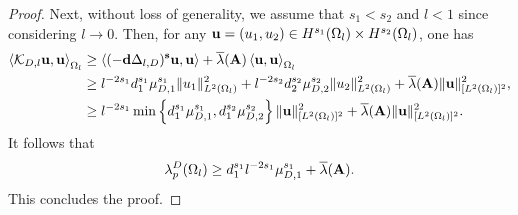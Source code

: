 \documentclass[a4paper,11pt]{amsart}
\newtheorem{proposition}[theorem]{Proposition}
\theoremstyle{definition}
\def\O{\Omega}
\numberwithin{equation}{section}
\theoremstyle{definition}
\def\O{\Omega}
\begin{document}
\begin{proof}
Next, without loss of generality, we assume that $s_1<s_2$ and $l<1$ since considering $l\rightarrow 0$. Then, for any ${\bf u}=(u_1,u_2)\in H^{s_1}(\O_l)\times H^{s_2}(\O_l)$, one has
\begin{align*}
\left<\mathcal{K}_{D,l}{\bf u},{\bf u}\right>_{\O_l} &\geq \left<(-\textbf{d}\Delta_{l,D})^{\textbf{s}}{\bf u},{\bf u} \right>+ \overline{\lambda}({\bf A}) \left<{\bf u},{\bf u}\right>_{\O_l}\\
&\geq l^{-2s_1}d_1^{s_1}\mu_{D,1}^{s_1}\|u_1\|_{L^2(\O_l)}^2 +  l^{-2s_2}d_2^{s_2}\mu_{D,2}^{s_2}\|u_2\|_{L^2( \O_l)}^2 + \overline{\lambda}({\bf A})\|{\bf u}\|_{[L^2(\O_l)]^2}^2,\\
&\geq l^{-2s_1} \min\left\{d_1^{s_1}\mu_{D,1}^{s_1},d_1^{s_2}\mu_{D,2}^{s_2}\right\}\|{\bf u}\|_{[L^2(\O_l)]^2}^2+ \overline{\lambda}({\bf A})\|{\bf u}\|_{[L^2(\O_l)]^2}^2.
\end{align*}
It follows that
\begin{align*}
\lambda^D_p(\O_l)\geq d_1^{s_1}l^{-2s_1}\mu_{D,1}^{s_1}+\overline{\lambda}({\bf A}).
\end{align*}
This concludes the proof.


\end{proof}




\end{document}
